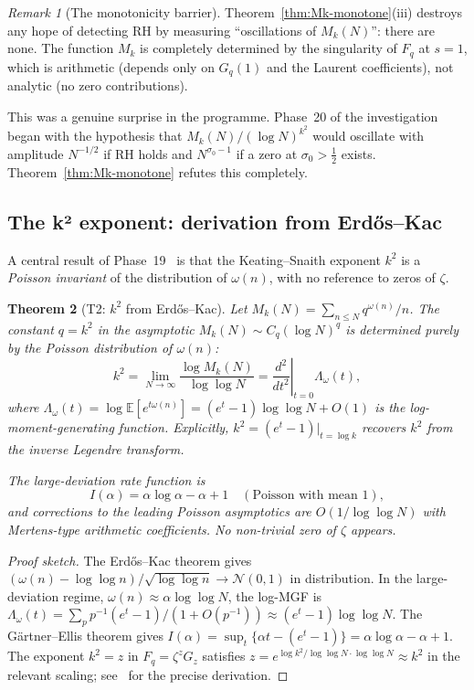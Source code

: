 \documentclass[11pt]{amsart}
\newtheorem{theorem}{Theorem}[section]
\theoremstyle{definition}
\theoremstyle{remark}
\newtheorem{remark}[theorem]{Remark}
\newcommand{\half}{\tfrac{1}{2}}
\newcommand{\om}{\omega}
\newcommand{\sig}{\sigma}
\newcommand{\Mk}{M_k}
\begin{document}
\begin{remark}[The monotonicity barrier]
Theorem~\ref{thm:Mk-monotone}(iii) destroys any hope of detecting RH by measuring
``oscillations of $M_k(N)$'': there are none.  The function $M_k$ is completely
determined by the singularity of $F_q$ at $s=1$, which is arithmetic (depends only
on $G_q(1)$ and the Laurent coefficients), not analytic (no zero contributions).

This was a genuine surprise in the programme.  Phase~20 of the investigation began
with the hypothesis that $M_k(N)/(\log N)^{k^2}$ would oscillate with amplitude
$N^{-1/2}$ if RH holds and $N^{\sig_0-1}$ if a zero at $\sig_0>\half$ exists.
Theorem~\ref{thm:Mk-monotone} refutes this completely.
\end{remark}

\subsection{The k² exponent: derivation from Erd\H{o}s--Kac}
\label{ss:k2}

A central result of Phase~19~\cite{RP9} is that the Keating--Snaith exponent $k^2$
is a \emph{Poisson invariant} of the distribution of $\om(n)$, with no reference to
zeros of $\zeta$.

\begin{theorem}[T2: $k^2$ from Erd\H{o}s--Kac]
\label{thm:k2}
Let $\Mk(N) = \sum_{n\le N} q^{\om(n)}/n$.  The constant $q = k^2$ in the asymptotic
$\Mk(N) \sim C_q (\log N)^q$ is determined purely by the Poisson distribution of
$\om(n)$:
\[
  k^2 = \lim_{N\to\infty} \frac{\log \Mk(N)}{\log\log N}
  = \left.\frac{d^2}{dt^2}\right|_{t=0} \Lambda_\om(t),
\]
where $\Lambda_\om(t) = \log\mathbb{E}[e^{t\om(n)}] = (e^t-1)\log\log N + O(1)$
is the log-moment-generating function.  Explicitly, $k^2 = (e^t-1)\big|_{t=\log k}$
recovers $k^2$ from the inverse Legendre transform.

The large-deviation rate function is
\[
  I(\alpha) = \alpha\log\alpha - \alpha + 1 \quad(\text{Poisson with mean } 1),
\]
and corrections to the leading Poisson asymptotics are $O(1/\log\log N)$ with
Mertens-type arithmetic coefficients.  No non-trivial zero of $\zeta$ appears.
\end{theorem}

\begin{proof}[Proof sketch]
The Erd\H{o}s--Kac theorem gives $(\om(n)-\log\log n)/\sqrt{\log\log n}\to\mathcal{N}(0,1)$
in distribution.  In the large-deviation regime, $\om(n)\approx\alpha\log\log N$, the
log-MGF is $\Lambda_\om(t) = \sum_p p^{-1}(e^t-1)/(1+O(p^{-1}))\approx(e^t-1)\log\log N$.
The G\"artner--Ellis theorem gives $I(\alpha) = \sup_t\{\alpha t - (e^t-1)\} =
\alpha\log\alpha - \alpha + 1$.  The exponent $k^2 = z$ in $F_q = \zeta^z G_z$
satisfies $z = e^{\log k^2/\log\log N \cdot \log\log N}\approx k^2$ in the relevant
scaling; see~\cite{RP9} for the precise derivation.
\end{proof}
\end{document}
